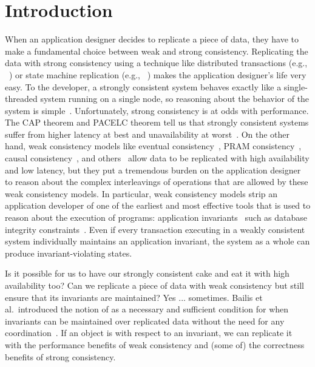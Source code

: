 \section{Introduction}
When an application designer decides to replicate a piece of data, they have to
make a fundamental choice between weak and strong consistency. Replicating the
data with strong consistency using a technique like distributed transactions (e.g., ~\cite{bernstein1981concurrency,mohan1986transaction}) or state machine
replication (e.g., ~\cite{schneider1990implementing, lamport1998part,
liskov2012viewstamped, ongaro2014search}) makes the
application designer's life very easy. To the developer, a strongly
consistent system behaves exactly like a single-threaded system running on a
single node, so reasoning about the behavior of the system is
simple~\cite{herlihy1990linearizability}.  Unfortunately, strong consistency is
at odds with performance. The CAP theorem and PACELC theorem tell us that
strongly consistent systems suffer from higher latency at best and
unavailability at worst~\cite{gilbert2002brewer, brewer2012cap,
abadi2012consistency}. On the other hand, weak consistency models like eventual
consistency~\cite{vogels2009eventually}, PRAM
consistency~\cite{lipton1988pram}, causal consistency~\cite{ahamad1995causal},
and others~\cite{lloyd2011don, mehdi2017can} allow data to be replicated with
high availability and low latency, but they put a tremendous burden on the
application designer to reason about the complex interleavings of operations
that are allowed by these weak consistency models. In particular, weak consistency
models strip an application developer of one of the earliest and most effective
tools that is used to reason about the execution of programs: application
invariants~\cite{hoare1969axiomatic, balegas2015towards} such as database integrity constraints~\cite{IntegrityConstraintCitations}. Even if every
transaction executing in a weakly consistent system individually maintains an
application invariant, the system as a whole can produce invariant-violating
states.

Is it possible for us to have our strongly consistent cake and eat it with high
availability too? Can we replicate a piece of data with weak consistency but
still ensure that its invariants are maintained? Yes ... sometimes. Bailis et al.\
introduced the notion of \emph{\invariantconfluence{}} as a necessary and sufficient
condition for when invariants can be maintained over replicated data without
the need for any coordination~\cite{bailis2014coordination}. If an object is
\invariantconfluent{} with respect to an invariant, we can replicate it with
the performance benefits of weak consistency and (some of) the correctness
benefits of strong consistency.

